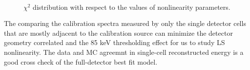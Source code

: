 \begin{figure}[h!]
\centering
{}\quad
{} \\
\caption{$\chi^2$ distribution with respect to the values of nonlinearity parameters.}
\label{fig:chi2}
\end{figure}
\newpage
\clearpage

\label{sec:single}
The comparing the calibration spectra measured by only the single detector cells that are mostly adjacent to the calibration source can minimize the detector geometry correlated and the 85 keV thresholding effect for us to study LS nonlinearity.
The data and MC agreemnt in single-cell reconstructed energy is a good cross check of the full-detector best fit model.

